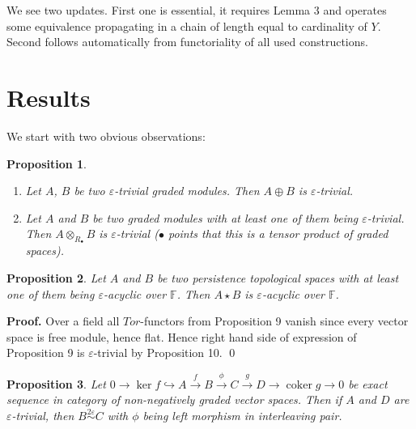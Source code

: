 \documentclass[a4paper, 12pt]{article}
\newtheorem{proposition}{Proposition}
\theoremstyle{definition}
\theoremstyle{remark}
\newenvironment{pf}{\noindent\textbf{Proof.}}{\qed}
\begin{document}
We see two updates. First one is essential, it requires Lemma 3 and operates some equivalence propagating in a chain of length equal to cardinality of $Y$. Second follows automatically from functoriality of all used constructions.

\section{Results}

We start with two obvious observations:

\begin{proposition} ~ \par
  \begin{enumerate}
    \item Let $A$, $B$ be two $\varepsilon$-trivial graded modules. Then $A \oplus B$ is $\varepsilon$-trivial.
    \item Let $A$ and $B$ be two graded modules with at least one of them being $\varepsilon$-trivial. Then $A \otimes_{R_{\bullet}} B$ is $\varepsilon$-trivial ($\bullet$ points that this is a tensor product of graded spaces).
  \end{enumerate}
\end{proposition}

\begin{proposition}
  Let $A$ and $B$ be two persistence topological spaces with at least one of them being $\varepsilon$-acyclic over $\mathbb{F}$. Then $A \star B$ is $\varepsilon$-acyclic over $\mathbb{F}$.
\end{proposition}

\begin{pf}
  Over a field all $Tor$-functors from Proposition 9 vanish since every vector space is free module, hence flat. Hence right hand side of expression of Proposition 9 is $\varepsilon$-trivial by Proposition 10.
\end{pf}

\begin{proposition}
  Let $0 \to \ker{f} \hookrightarrow A \xrightarrow{f} B \xrightarrow{\phi} C \xrightarrow{g} D \to \operatorname{coker}g \to 0$ be exact sequence in category of non-negatively graded vector spaces. Then if $A$ and $D$ are $\varepsilon$-trivial, then $B \stackrel{2\varepsilon}{\sim} C$ with $\phi$ being left morphism in interleaving pair.
\end{proposition}
\end{document}
